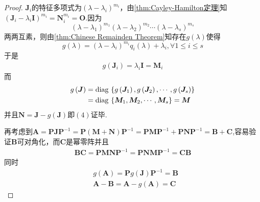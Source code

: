 {\begin{proof}
        $\bm{J}_i$的特征多项式为$\left(\lambda-\lambda_i\right)^{m_i}$，由\cref{thm:Cayley-Hamilton定理}知$
            \left(
            \bm{J}_i-\lambda_i\bm{I}
            \right)^{m_i}=
            \bm{N}_i^{m_i}=\bm{O}
        $.因为\[
            \left(\lambda-\lambda_1\right)^{m_1}\left(\lambda-\lambda_2\right)^{m_2}\cdots\left(\lambda-\lambda_s\right)^{m_s}
        \]两两互素，则由\cref{thm:Chinese Remainden Theorem}知存在$g\left(\lambda\right)$使得\[
            g\left(\lambda\right)=\left(\lambda-\lambda_i\right)^{m_i}q_i\left(\lambda\right)+\lambda_i,\forall 1\leqslant i\leqslant s
        \]于是\begin{align*}
            g\left(\bm{J}_i\right)=\lambda_i\bm{I}=\bm{M}_i
        \end{align*}而\begin{align*}
            g\left(\bm{J}\right) & =\operatorname{diag\,} \left\{
            g\left(\bm{J}_1\right),g\left(\bm{J}_2\right),\cdots,g\left(\bm{J}_s\right)
            \right\}                              \\
                                 & =\operatorname{diag\,} \left\{
            \bm{M}_1,\bm{M}_2,\cdots,\bm{M}_s
            \right\}=\bm{M}
        \end{align*}并且$\bm{N}=\bm{J}-g\left(\bm{J}\right)$即$(4)$证毕.

        再考虑到$\bm{A}=\bm{P}\bm{JP}^{-1}=\bm{P}\left(\bm{M}+\bm{N}\right)\bm{P}^{-1}=\bm{P}\bm{MP}^{-1}+\bm{P}\bm{NP}^{-1}=\bm{B}+\bm{C}$,容易验证$\bm{B}$可对角化，而$\bm{C}$是幂零阵并且\begin{align*}
            \bm{BC}=\bm{PMNP}^{-1}=\bm{PNMP}^{-1}=\bm{CB}
        \end{align*}同时\begin{align*}
             & g\left(\bm{A}\right)=\bm{P}g\left(\bm{J}\right)\bm{P}^{-1}=\bm{B} \\
             & \bm{A}-\bm{B}=\bm{A}-g\left(\bm{A}\right)=\bm{C}
        \end{align*}


\end{proof}}
